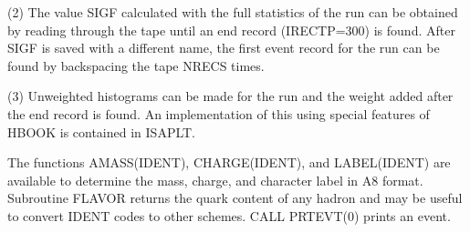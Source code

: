       (2) The value SIGF calculated with the full statistics of the run
can be obtained by reading through the tape until an end record
(IRECTP=300) is found. After SIGF is saved with a different name, the
first event record for the run can be found by backspacing the tape
NRECS times.

      (3) Unweighted histograms can be made for the run and the weight
added after the end record is found. An implementation of this using
special features of HBOOK is contained in ISAPLT.

      The functions AMASS(IDENT), CHARGE(IDENT), and LABEL(IDENT) are
available to determine the mass, charge, and character label in A8
format. Subroutine FLAVOR returns the quark content of any hadron and
may be useful to convert IDENT codes to other schemes. CALL PRTEVT(0)
prints an event.
